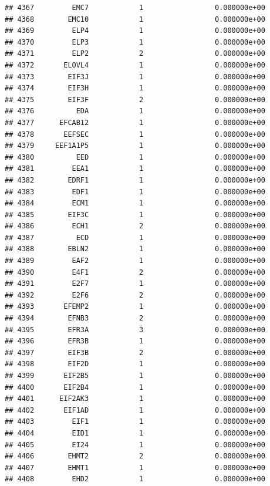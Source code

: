 \documentclass[
]{article}
\begin{document}
\begin{verbatim}
## 4367         EMC7            1                 0.000000e+00
## 4368        EMC10            1                 0.000000e+00
## 4369         ELP4            1                 0.000000e+00
## 4370         ELP3            1                 0.000000e+00
## 4371         ELP2            2                 0.000000e+00
## 4372       ELOVL4            1                 0.000000e+00
## 4373        EIF3J            1                 0.000000e+00
## 4374        EIF3H            1                 0.000000e+00
## 4375        EIF3F            2                 0.000000e+00
## 4376          EDA            1                 0.000000e+00
## 4377      EFCAB12            1                 0.000000e+00
## 4378       EEFSEC            1                 0.000000e+00
## 4379     EEF1A1P5            1                 0.000000e+00
## 4380          EED            1                 0.000000e+00
## 4381         EEA1            1                 0.000000e+00
## 4382        EDRF1            1                 0.000000e+00
## 4383         EDF1            1                 0.000000e+00
## 4384         ECM1            1                 0.000000e+00
## 4385        EIF3C            1                 0.000000e+00
## 4386         ECH1            2                 0.000000e+00
## 4387          ECD            1                 0.000000e+00
## 4388        EBLN2            1                 0.000000e+00
## 4389         EAF2            1                 0.000000e+00
## 4390         E4F1            2                 0.000000e+00
## 4391         E2F7            1                 0.000000e+00
## 4392         E2F6            2                 0.000000e+00
## 4393       EFEMP2            1                 0.000000e+00
## 4394        EFNB3            2                 0.000000e+00
## 4395        EFR3A            3                 0.000000e+00
## 4396        EFR3B            1                 0.000000e+00
## 4397        EIF3B            2                 0.000000e+00
## 4398        EIF2D            1                 0.000000e+00
## 4399       EIF2B5            1                 0.000000e+00
## 4400       EIF2B4            1                 0.000000e+00
## 4401      EIF2AK3            1                 0.000000e+00
## 4402       EIF1AD            1                 0.000000e+00
## 4403         EIF1            1                 0.000000e+00
## 4404         EID1            1                 0.000000e+00
## 4405         EI24            1                 0.000000e+00
## 4406        EHMT2            2                 0.000000e+00
## 4407        EHMT1            1                 0.000000e+00
## 4408         EHD2            1                 0.000000e+00

\end{verbatim}
\end{document}
